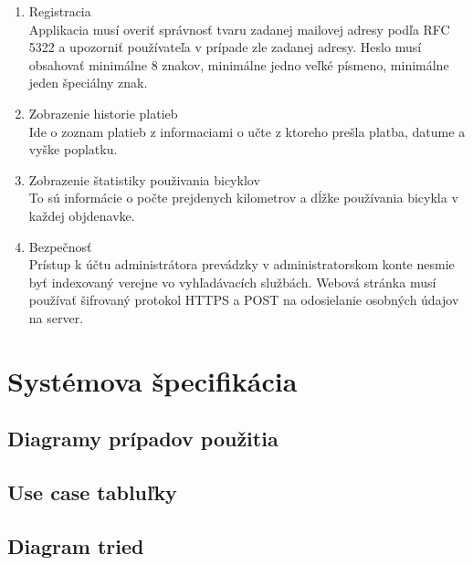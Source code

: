 \documentclass[12pt]{report}
\begin{document}
\begin{enumerate}
    \item Registracia \\
	      Applikacia musí overiť správnosť tvaru zadanej mailovej adresy podľa RFC 5322 
        a upozorniť používateľa v prípade zle zadanej adresy. Heslo musí obsahovať minimálne 8 
        znakov, minimálne jedno veľké písmeno, minimálne jeden špeciálny znak.

    \item Zobrazenie historie platieb\\
        Ide o zoznam platieb z informaciami o učte z ktoreho prešla platba, datume a vyške poplatku.

    \item Zobrazenie štatistiky použivania bicyklov\\
        To sú informácie o počte prejdenych kilometrov a dĺžke používania bicykla v každej objdenavke.

    \item Bezpečnosť\\
        Prístup k účtu administrátora prevádzky v administratorskom konte nesmie byť indexovaný verejne vo
        vyhľadávacích službách. Webová stránka musí používať šifrovaný protokol HTTPS a POST na odosielanie osobných 
        údajov na server.
\end{enumerate}

\chapter{Systémova špecifikácia}
\section{Diagramy prípadov použitia}

\clearpage 

\section{Use case tabluľky}

\clearpage 


\clearpage 


\clearpage 

\section{Diagram tried}

\clearpage 
\end{document}
